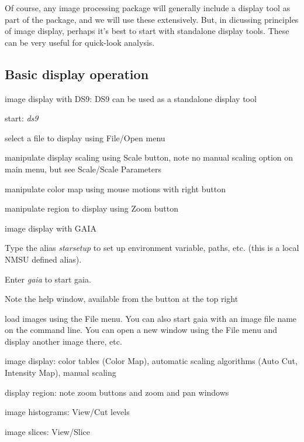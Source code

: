 \documentclass{article}
\begin{document}
Of course, any image processing package will generally include a
display tool as part of the package, and we will use these
extensively. But, in dicussing principles of image display, perhaps
it's best to start with standalone display tools. These can be very
useful for quick-look analysis.

\subsection*{Basic display operation}
\begin{itemize*}
    \item image display with DS9: DS9 can be used as a standalone display tool
        \begin{itemize*}
            \item start: \emph{ds9}
            \item select a file to display using File/Open menu
            \item manipulate display scaling using Scale button,
                note no manual scaling option on main menu,
                but see Scale/Scale Parameters
            \item manipulate color map using mouse motions with right button
            \item manipulate region to display using Zoom button
        \end{itemize*}
    \item image display with GAIA
        \begin{itemize*}
            \item Type the alias \emph{starsetup} to set up environment variable,
                paths, etc. (this is a local NMSU defined alias).
            \item Enter \emph{gaia} to start gaia.
            \item Note the help window, available from the button at the
                top right
            \item load images using the File menu. You can also start
                gaia with an image file name on the command line. You can open a new window using the
                File menu and display another image there, etc.
            \item image display: color tables (Color Map), automatic scaling
                algorithms (Auto Cut, Intensity Map), manual scaling
            \item display region: note zoom buttons and zoom and pan windows
            \item image histograms: View/Cut levels
            \item image slices: View/Slice
        \end{itemize*}
\end{itemize*}
\end{document}
